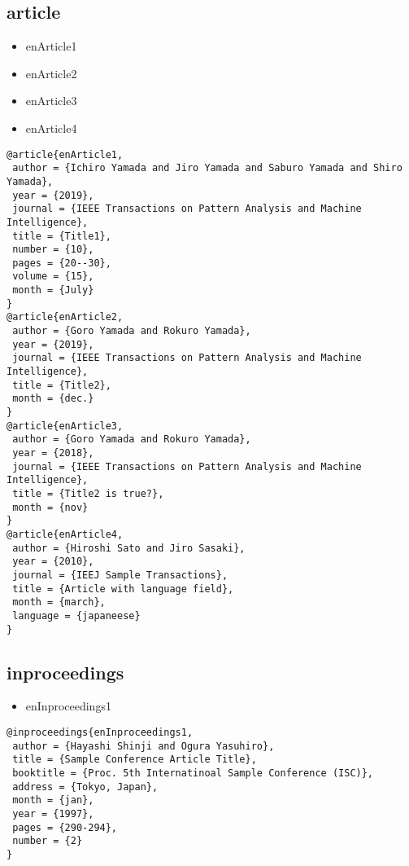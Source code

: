 \documentclass[9pt, twocolumn, a4paper]{jsarticle}
\begin{document}
\begin{bibunit}[IEEJtran]

\subsection{article}

\begin{itemize}
  \item enArticle1 \cite{enArticle1}
  \item enArticle2 \cite{enArticle2}
  \item enArticle3 \cite{enArticle3}
  \item enArticle4 \cite{enArticle4}
\end{itemize}

\begin{lstlisting}
@article{enArticle1,
 author = {Ichiro Yamada and Jiro Yamada and Saburo Yamada and Shiro Yamada},
 year = {2019},
 journal = {IEEE Transactions on Pattern Analysis and Machine Intelligence},
 title = {Title1},
 number = {10},
 pages = {20--30},
 volume = {15},
 month = {July}
}
@article{enArticle2,
 author = {Goro Yamada and Rokuro Yamada},
 year = {2019},
 journal = {IEEE Transactions on Pattern Analysis and Machine Intelligence},
 title = {Title2},
 month = {dec.}
}
@article{enArticle3,
 author = {Goro Yamada and Rokuro Yamada},
 year = {2018},
 journal = {IEEE Transactions on Pattern Analysis and Machine Intelligence},
 title = {Title2 is true?},
 month = {nov}
}
@article{enArticle4,
 author = {Hiroshi Sato and Jiro Sasaki},
 year = {2010},
 journal = {IEEJ Sample Transactions},
 title = {Article with language field},
 month = {march},
 language = {japaneese}
}
\end{lstlisting}

\subsection{inproceedings}

\begin{itemize}
  \item enInproceedings1 \cite{enInproceedings1}
\end{itemize}

\begin{lstlisting}
@inproceedings{enInproceedings1,
 author = {Hayashi Shinji and Ogura Yasuhiro},
 title = {Sample Conference Article Title},
 booktitle = {Proc. 5th Internatinoal Sample Conference (ISC)},
 address = {Tokyo, Japan},
 month = {jan},
 year = {1997},
 pages = {290-294},
 number = {2}
}
\end{lstlisting}


\end{bibunit}
\end{document}
